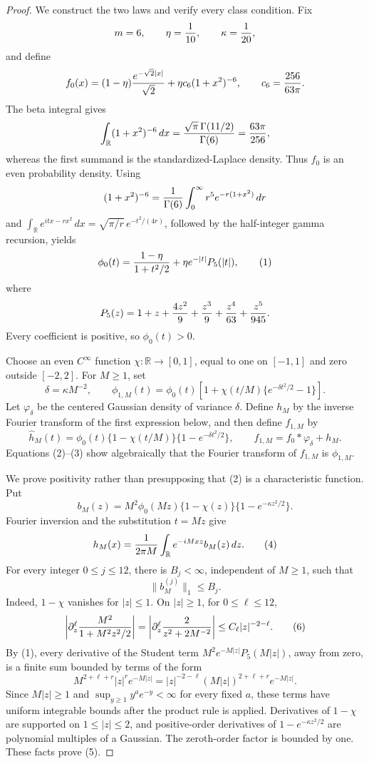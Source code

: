 \documentclass{article}
\begin{document}
\begin{proof}
We construct the two laws and verify every class condition.  Fix
\[
 m=6,\qquad \eta={1\over10},\qquad \kappa={1\over20},
\]
and define
\[
 f_0(x)=(1-\eta){e^{-\sqrt2|x|}\over\sqrt2}
       +\eta c_6(1+x^2)^{-6},
 \qquad c_6={256\over63\pi}.
\]
The beta integral gives
\[
 \int_{\mathbb R}(1+x^2)^{-6}\,dx
 ={\sqrt\pi\,\Gamma(11/2)\over\Gamma(6)}={63\pi\over256},
\]
whereas the first summand is the standardized-Laplace density.  Thus \(f_0\) is an even probability density.  Using
\[
 (1+x^2)^{-6}={1\over\Gamma(6)}
 \int_0^\infty r^5e^{-r(1+x^2)}\,dr
\]
and \(\int_{\mathbb R}e^{itx-rx^2}\,dx=\sqrt{\pi/r}\,e^{-t^2/(4r)}\), followed by the half-integer gamma recursion, yields
\[
 \phi_0(t)={1-\eta\over1+t^2/2}+\eta e^{-|t|}P_5(|t|), \tag{1}
\]
where
\[
 P_5(z)=1+z+{4z^2\over9}+{z^3\over9}
       +{z^4\over63}+{z^5\over945}.
\]
Every coefficient is positive, so \(\phi_0(t)>0\).

Choose an even \(C^\infty\) function \(\chi:\mathbb R\to[0,1]\), equal to one on \([-1,1]\) and zero outside \([-2,2]\).  For \(M\ge1\), set
\[
 \delta=\kappa M^{-2},\qquad
 \phi_{1,M}(t)=\phi_0(t)
 \left[1+\chi(t/M)\{e^{-\delta t^2/2}-1\}\right]. \tag{2}
\]
Let \(\varphi_\delta\) be the centered Gaussian density of variance \(\delta\).  Define \(h_M\) by the inverse Fourier transform of the first expression below, and then define \(f_{1,M}\) by
\[
 \widehat h_M(t)=\phi_0(t)\{1-\chi(t/M)\}
                 \{1-e^{-\delta t^2/2}\},
 \qquad f_{1,M}=f_0*\varphi_\delta+h_M. \tag{3}
\]
Equations (2)--(3) show algebraically that the Fourier transform of \(f_{1,M}\) is \(\phi_{1,M}\).

We prove positivity rather than presupposing that (2) is a characteristic function.  Put
\[
 b_M(z)=M^2\phi_0(Mz)\{1-\chi(z)\}
             \{1-e^{-\kappa z^2/2}\}.
\]
Fourier inversion and the substitution \(t=Mz\) give
\[
 h_M(x)={1\over2\pi M}
 \int_{\mathbb R}e^{-iMxz}b_M(z)\,dz. \tag{4}
\]
For every integer \(0\le j\le12\), there is \(B_j<\infty\), independent of \(M\ge1\), such that
\[
 \|b_M^{(j)}\|_1\le B_j. \tag{5}
\]
Indeed, \(1-\chi\) vanishes for \(|z|\le1\).  On \(|z|\ge1\), for \(0\le\ell\le12\),
\[
 \left|\partial_z^\ell{M^2\over1+M^2z^2/2}\right|
 =\left|\partial_z^\ell{2\over z^2+2M^{-2}}\right|
 \le C_\ell |z|^{-2-\ell}. \tag{6}
\]
By (1), every derivative of the Student term \(M^2e^{-M|z|}P_5(M|z|)\), away from zero, is a finite sum bounded by terms of the form
\[
 M^{2+\ell+r}|z|^re^{-M|z|}
 =|z|^{-2-\ell}(M|z|)^{2+\ell+r}e^{-M|z|}.
\]
Since \(M|z|\ge1\) and \(\sup_{y\ge1}y^ae^{-y}<\infty\) for every fixed \(a\), these terms have uniform integrable bounds after the product rule is applied.  Derivatives of \(1-\chi\) are supported on \(1\le|z|\le2\), and positive-order derivatives of \(1-e^{-\kappa z^2/2}\) are polynomial multiples of a Gaussian.  The zeroth-order factor is bounded by one.  These facts prove (5).


\end{proof}
\end{document}

